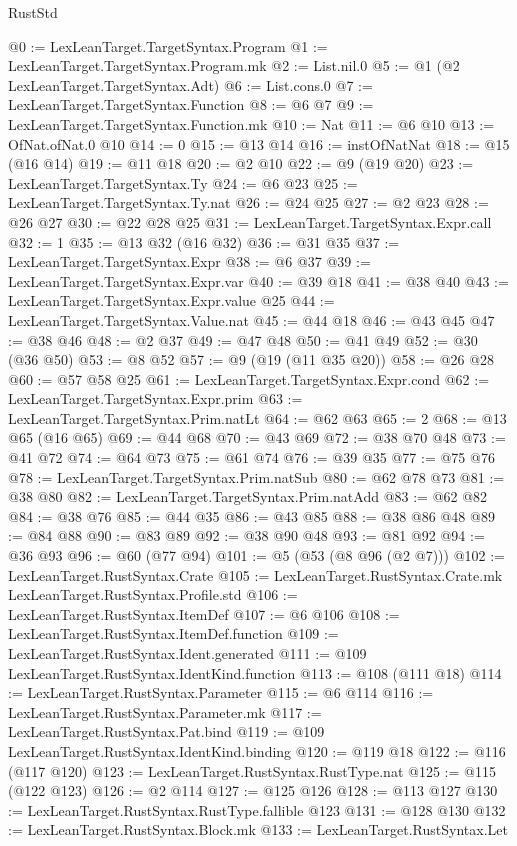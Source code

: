 \begin{lexlean}{RustStd}
\begin{coremodule}
@0 := LexLeanTarget.TargetSyntax.Program
@1 := LexLeanTarget.TargetSyntax.Program.mk
@2 := List.nil.{0}
@5 := @1 (@2 LexLeanTarget.TargetSyntax.Adt)
@6 := List.cons.{0}
@7 := LexLeanTarget.TargetSyntax.Function
@8 := @6 @7
@9 := LexLeanTarget.TargetSyntax.Function.mk
@10 := Nat
@11 := @6 @10
@13 := OfNat.ofNat.{0} @10
@14 := 0
@15 := @13 @14
@16 := instOfNatNat
@18 := @15 (@16 @14)
@19 := @11 @18
@20 := @2 @10
@22 := @9 (@19 @20)
@23 := LexLeanTarget.TargetSyntax.Ty
@24 := @6 @23
@25 := LexLeanTarget.TargetSyntax.Ty.nat
@26 := @24 @25
@27 := @2 @23
@28 := @26 @27
@30 := @22 @28 @25
@31 := LexLeanTarget.TargetSyntax.Expr.call
@32 := 1
@35 := @13 @32 (@16 @32)
@36 := @31 @35
@37 := LexLeanTarget.TargetSyntax.Expr
@38 := @6 @37
@39 := LexLeanTarget.TargetSyntax.Expr.var
@40 := @39 @18
@41 := @38 @40
@43 := LexLeanTarget.TargetSyntax.Expr.value @25
@44 := LexLeanTarget.TargetSyntax.Value.nat
@45 := @44 @18
@46 := @43 @45
@47 := @38 @46
@48 := @2 @37
@49 := @47 @48
@50 := @41 @49
@52 := @30 (@36 @50)
@53 := @8 @52
@57 := @9 (@19 (@11 @35 @20))
@58 := @26 @28
@60 := @57 @58 @25
@61 := LexLeanTarget.TargetSyntax.Expr.cond
@62 := LexLeanTarget.TargetSyntax.Expr.prim
@63 := LexLeanTarget.TargetSyntax.Prim.natLt
@64 := @62 @63
@65 := 2
@68 := @13 @65 (@16 @65)
@69 := @44 @68
@70 := @43 @69
@72 := @38 @70 @48
@73 := @41 @72
@74 := @64 @73
@75 := @61 @74
@76 := @39 @35
@77 := @75 @76
@78 := LexLeanTarget.TargetSyntax.Prim.natSub
@80 := @62 @78 @73
@81 := @38 @80
@82 := LexLeanTarget.TargetSyntax.Prim.natAdd
@83 := @62 @82
@84 := @38 @76
@85 := @44 @35
@86 := @43 @85
@88 := @38 @86 @48
@89 := @84 @88
@90 := @83 @89
@92 := @38 @90 @48
@93 := @81 @92
@94 := @36 @93
@96 := @60 (@77 @94)
@101 := @5 (@53 (@8 @96 (@2 @7)))
@102 := LexLeanTarget.RustSyntax.Crate
@105 := LexLeanTarget.RustSyntax.Crate.mk LexLeanTarget.RustSyntax.Profile.std
@106 := LexLeanTarget.RustSyntax.ItemDef
@107 := @6 @106
@108 := LexLeanTarget.RustSyntax.ItemDef.function
@109 := LexLeanTarget.RustSyntax.Ident.generated
@111 := @109 LexLeanTarget.RustSyntax.IdentKind.function
@113 := @108 (@111 @18)
@114 := LexLeanTarget.RustSyntax.Parameter
@115 := @6 @114
@116 := LexLeanTarget.RustSyntax.Parameter.mk
@117 := LexLeanTarget.RustSyntax.Pat.bind
@119 := @109 LexLeanTarget.RustSyntax.IdentKind.binding
@120 := @119 @18
@122 := @116 (@117 @120)
@123 := LexLeanTarget.RustSyntax.RustType.nat
@125 := @115 (@122 @123)
@126 := @2 @114
@127 := @125 @126
@128 := @113 @127
@130 := LexLeanTarget.RustSyntax.RustType.fallible @123
@131 := @128 @130
@132 := LexLeanTarget.RustSyntax.Block.mk
@133 := LexLeanTarget.RustSyntax.Let

\end{coremodule}
\end{lexlean}
